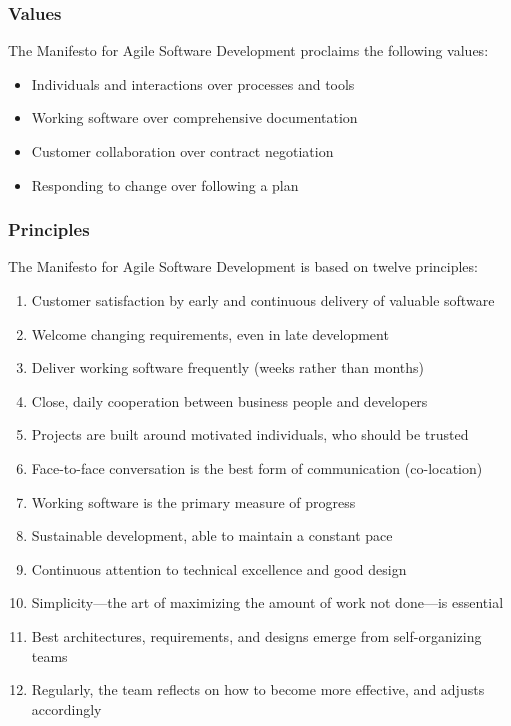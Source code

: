 \subsubsection{Values}

The Manifesto for Agile Software Development proclaims the following values:

\begin{itemize}
	\item Individuals and interactions over processes and tools
	\item Working software over comprehensive documentation
	\item Customer collaboration over contract negotiation
	\item Responding to change over following a plan
\end{itemize}

\subsubsection{Principles}

The Manifesto for Agile Software Development is based on twelve principles:

\begin{enumerate}
	\item Customer satisfaction by early and continuous delivery of valuable software
	\item Welcome changing requirements, even in late development
	\item Deliver working software frequently (weeks rather than months)
	\item Close, daily cooperation between business people and developers
	\item Projects are built around motivated individuals, who should be trusted
	\item Face-to-face conversation is the best form of communication (co-location)
	\item Working software is the primary measure of progress
	\item Sustainable development, able to maintain a constant pace
	\item Continuous attention to technical excellence and good design
	\item Simplicity—the art of maximizing the amount of work not done—is essential
	\item Best architectures, requirements, and designs emerge from self-organizing teams
	\item Regularly, the team reflects on how to become more effective, and adjusts accordingly
\end{enumerate}

